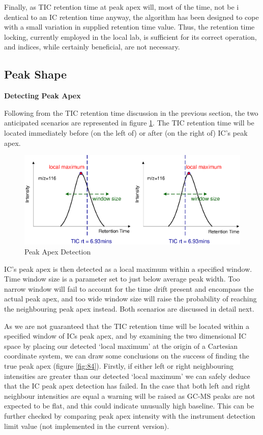 Finally, as TIC retention time at peak apex will, most of the time, not be i
dentical to an IC retention time anyway, the algorithm has been designed to 
cope with a small variation in supplied retention time value. Thus, the 
retention time locking, currently employed in the local lab, is sufficient 
for its correct operation, and indices, while certainly beneficial, are not 
necessary.

\subsection{Peak Shape}

{\bf Detecting Peak Apex}

Following from the TIC retention time discussion in the previous section, the 
two anticipated scenarios are represented in figure \ref{fig:83}. The TIC retention 
time will be located immediately before (on the left of) or after 
(on the right of) IC’s peak apex.

\begin{figure}
  \begin{center}
    \includegraphics[scale=0.7]{graphics/chapter08/83.eps}
  \end{center}
  \caption{Peak Apex Detection}
  \label{fig:83}
\end{figure}


IC’s peak apex is then detected as a local maximum within a specified window. 
Time window size is a parameter set to just below average peak width. Too narrow 
window will fail to account for the time drift present and encompass the actual 
peak apex, and too wide window size will raise the probability of reaching the 
neighbouring peak apex instead. Both scenarios are discussed in detail next. 

As we are not guaranteed that the TIC retention time will be located within a 
specified window of ICs peak apex, and by examining the two dimensional IC 
space by placing our detected ‘local maximum’ at the origin of a Cartesian 
coordinate system, we can draw some conclusions on the success of finding the 
true peak apex (figure \ref{fig:84}). Firstly, if either left or right neighbouring intensities are 
greater than our detected ‘local maximum’ we can safely deduce that the IC peak 
apex detection has failed. In the case that both left and right neighbour 
intensities are equal a warning will be raised as GC-MS peaks are not expected 
to be flat, and this could indicate unusually high baseline. This can be further 
checked by comparing peak apex intensity with the instrument detection limit 
value (not implemented in the current version).

